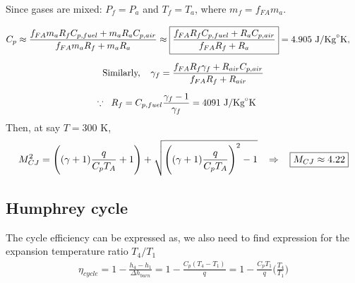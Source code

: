 \documentclass[a4paper,10pt]{article}
\begin{document}
Since gases are mixed: $P_f = P_a$ and $T_f = T_a$, where $m_f = f_{FA}m_a$.

\vspace*{-0.5cm}
\begin{gather*}
    C_p\approx\frac{f_{FA}m_aR_fC_{p,fuel}+m_aR_aC_{p,air}}{f_{FA}m_aR_f+m_aR_a}\approx\boxed{\frac{f_{FA}R_fC_{p,fuel}+R_aC_{p,air}}{f_{FA}R_f+R_a}} = 4.905\text{ J/Kg}^{\circ}\text{K},\hspace*{0.4cm}\\[0.2cm]
    \text{Similarly,}\hspace*{0.4cm}\gamma_f = \frac{f_{FA}R_f\gamma_f+R_{air}C_{p,air}}{f_{FA}R_f+R_{air}}\\[0.2cm]
    \because\hspace*{0.2cm}R_f = C_{p,fuel}\frac{\gamma_f-1}{\gamma_f} = 4091\text{ J/Kg}^{\circ}\text{K}\hspace*{0.5cm}
\end{gather*}
Then, at say $T = 300$ K,
\begin{gather*}
    M_{CJ}^2 = \Bigg((\gamma+1)\frac{q}{C_pT_A}+1\Bigg)+\sqrt{\Bigg((\gamma+1)\frac{q}{C_pT_A}\Bigg)^2-1}\hspace*{0.3cm}\Rightarrow\hspace*{0.3cm}\boxed{M_{CJ} \approx4.22}
\end{gather*}

\subsection{Humphrey cycle}
The cycle efficiency can be expressed as, we also need to find expression for the expansion temperature ratio $T_4/T_1$
\begin{gather*}
    \eta_{cycle} = 1-\frac{h_4-h_1}{\Delta h_{burn}}=1-\frac{C_p(T_4-T_1)}{q} = 1-\frac{C_pT_1}{q}\Bigg(\frac{T_4}{T_1}\Bigg)
\end{gather*}
\end{document}
